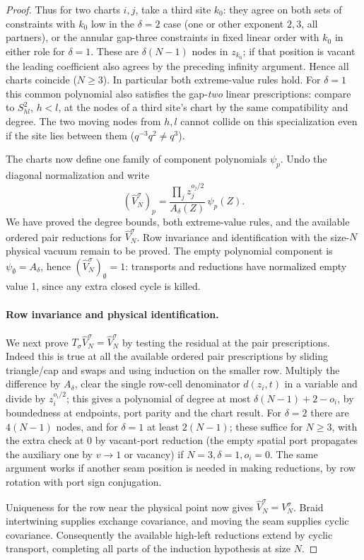 \begin{proof}
Thus for two charts \(i,j\), take a third site \(k_0\): they agree on both sets of constraints with \(k_0\) low in the \(\delta=2\) case (one or other exponent \(2,3\), all partners), or the annular gap-three constraints in fixed linear order with \(k_0\) in either role for \(\delta=1\). These are \(\delta(N-1)\) nodes in \(z_{k_0}\); if that position is vacant the leading coefficient also agrees by the preceding infinity argument. Hence all charts coincide (\(N\ge3\)). In particular both extreme-value rules hold. For \(\delta=1\) this common polynomial also satisfies the gap-\emph{two} linear prescriptions: compare to \(S_{hl}^2\), \(h<l\), at the nodes of a third site's chart by the same compatibility and degree. The two moving nodes from \(h,l\) cannot collide on this specialization even if the site lies between them (\(q^{-3}q^2\ne q^3\)).

The charts now define one family of component polynomials $\psi_p$.
Undo the diagonal normalization and write
\[
 (\widehat V_N^\sigma)_p
 =\frac{\prod_j z_j^{o_j/2}}{A_\delta(Z)}\,\psi_p(Z).
\]
We have proved the degree bounds, both extreme-value rules, and the
available ordered pair reductions for $\widehat V_N^\sigma$. Row invariance and identification with the size-$N$ physical vacuum remain
to be proved.
The empty polynomial component is \(\psi_\emptyset=A_\delta\), hence \((\widehat V_N^\sigma)_\emptyset=1\): transports and reductions have normalized empty value 1, since any extra closed cycle is killed.

\paragraph{Row invariance and physical identification.}
We next prove $T_\sigma\widehat V_N^\sigma=\widehat V_N^\sigma$ by testing
the residual at the pair prescriptions. Indeed this is true at all the available ordered pair prescriptions by sliding triangle/cap and swaps and using induction on the smaller row. Multiply the difference by \(A_\delta\), clear the single row-cell denominator \(d(z_i,t)\) in a variable and divide by \(z_i^{o_i/2}\); this gives a polynomial of degree at most \(\delta(N-1)+2-o_i\), by boundedness at endpoints, port parity and the chart result. For \(\delta=2\) there are \(4(N-1)\) nodes, and for \(\delta=1\) at least \(2(N-1)\); these suffice for \(N\ge3\), with the extra check at 0 by vacant-port reduction (the empty spatial port propagates the auxiliary one by \(v\to1\) or vacancy) if \(N=3,\delta=1,o_i=0\). The same argument works if another seam position is needed in making reductions, by row rotation with port sign conjugation.

Uniqueness for the row near the physical point now gives
$\widehat V_N^\sigma=V_N^\sigma$. Braid intertwining supplies exchange
covariance, and moving the seam supplies cyclic covariance. Consequently
the available high-left reductions extend by cyclic transport, completing
all parts of the induction hypothesis at size $N$.
\end{proof}


